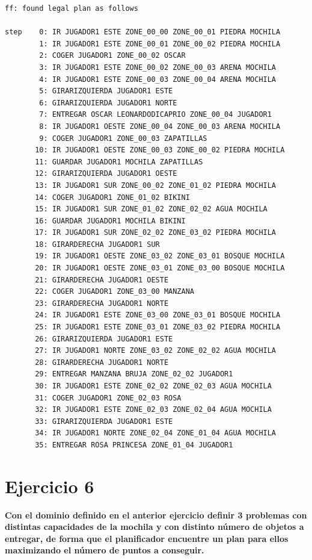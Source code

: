 \documentclass[12pt]{article}
\begin{document}
\begin{verbatim}
ff: found legal plan as follows

step    0: IR JUGADOR1 ESTE ZONE_00_00 ZONE_00_01 PIEDRA MOCHILA
        1: IR JUGADOR1 ESTE ZONE_00_01 ZONE_00_02 PIEDRA MOCHILA
        2: COGER JUGADOR1 ZONE_00_02 OSCAR
        3: IR JUGADOR1 ESTE ZONE_00_02 ZONE_00_03 ARENA MOCHILA
        4: IR JUGADOR1 ESTE ZONE_00_03 ZONE_00_04 ARENA MOCHILA
        5: GIRARIZQUIERDA JUGADOR1 ESTE
        6: GIRARIZQUIERDA JUGADOR1 NORTE
        7: ENTREGAR OSCAR LEONARDODICAPRIO ZONE_00_04 JUGADOR1
        8: IR JUGADOR1 OESTE ZONE_00_04 ZONE_00_03 ARENA MOCHILA
        9: COGER JUGADOR1 ZONE_00_03 ZAPATILLAS
       10: IR JUGADOR1 OESTE ZONE_00_03 ZONE_00_02 PIEDRA MOCHILA
       11: GUARDAR JUGADOR1 MOCHILA ZAPATILLAS
       12: GIRARIZQUIERDA JUGADOR1 OESTE
       13: IR JUGADOR1 SUR ZONE_00_02 ZONE_01_02 PIEDRA MOCHILA
       14: COGER JUGADOR1 ZONE_01_02 BIKINI
       15: IR JUGADOR1 SUR ZONE_01_02 ZONE_02_02 AGUA MOCHILA
       16: GUARDAR JUGADOR1 MOCHILA BIKINI
       17: IR JUGADOR1 SUR ZONE_02_02 ZONE_03_02 PIEDRA MOCHILA
       18: GIRARDERECHA JUGADOR1 SUR
       19: IR JUGADOR1 OESTE ZONE_03_02 ZONE_03_01 BOSQUE MOCHILA
       20: IR JUGADOR1 OESTE ZONE_03_01 ZONE_03_00 BOSQUE MOCHILA
       21: GIRARDERECHA JUGADOR1 OESTE
       22: COGER JUGADOR1 ZONE_03_00 MANZANA
       23: GIRARDERECHA JUGADOR1 NORTE
       24: IR JUGADOR1 ESTE ZONE_03_00 ZONE_03_01 BOSQUE MOCHILA
       25: IR JUGADOR1 ESTE ZONE_03_01 ZONE_03_02 PIEDRA MOCHILA
       26: GIRARIZQUIERDA JUGADOR1 ESTE
       27: IR JUGADOR1 NORTE ZONE_03_02 ZONE_02_02 AGUA MOCHILA
       28: GIRARDERECHA JUGADOR1 NORTE
       29: ENTREGAR MANZANA BRUJA ZONE_02_02 JUGADOR1
       30: IR JUGADOR1 ESTE ZONE_02_02 ZONE_02_03 AGUA MOCHILA
       31: COGER JUGADOR1 ZONE_02_03 ROSA
       32: IR JUGADOR1 ESTE ZONE_02_03 ZONE_02_04 AGUA MOCHILA
       33: GIRARIZQUIERDA JUGADOR1 ESTE
       34: IR JUGADOR1 NORTE ZONE_02_04 ZONE_01_04 AGUA MOCHILA
       35: ENTREGAR ROSA PRINCESA ZONE_01_04 JUGADOR1

\end{verbatim}


\section{Ejercicio 6} \textbf{Con el dominio definido en el anterior ejercicio definir 3 problemas con
distintas capacidades de la mochila y con distinto número de objetos a entregar, de
forma que el planificador encuentre un plan para ellos maximizando el número de
puntos a conseguir.}
\end{document}
